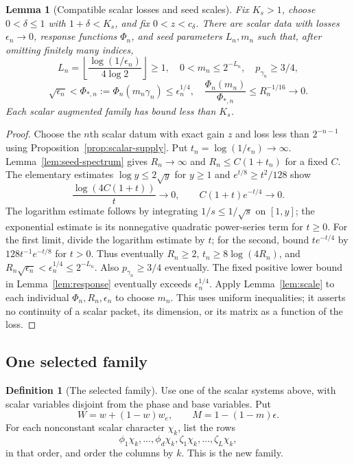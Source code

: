 \documentclass[reqno,a4paper,12pt]{amsart}
\newtheorem{lemma}[theorem]{Lemma}
\theoremstyle{definition}
\newtheorem{definition}[theorem]{Definition}
\begin{document}
\begin{lemma}[Compatible scalar losses and seed scales]\label{lem:seed-scales}
Fix $K_s>1$, choose $0<\delta\le1$ with $1+\delta<K_s$, and fix
$0<z<c_\delta$. There are scalar data with losses $\epsilon_n\to0$,
response functions $\Phi_n$, and seed parameters $L_n,m_n$ such that,
after omitting finitely many indices,
\[
 L_n=\left\lfloor\frac{\log(1/\epsilon_n)}{4\log2}\right\rfloor\ge1,
 \quad 0<m_n\le2^{-L_n},\quad p_{\gamma_n}\ge3/4,
\]
\[
 \sqrt{\epsilon_n}<\Phi_{*,n}:=\Phi_n(m_n\gamma_n)
 \le\epsilon_n^{1/4},\quad
 \frac{\Phi_n(m_n)}{\Phi_{*,n}}\le R_n^{-1/16}\to0.
\]
Each scalar augmented family has bound less than $K_s$.
\end{lemma}
\begin{proof}
Choose the $n$th scalar datum with exact gain $z$ and loss less than
$2^{-n-1}$ using Proposition~\ref{prop:scalar-supply}.
Put $t_n=\log(1/\epsilon_n)\to\infty$. Lemma~\ref{lem:seed-spectrum}
gives $R_n\to\infty$ and $R_n\le C(1+t_n)$ for a fixed $C$.
The elementary estimates
$\log y\le2\sqrt y$ for $y\ge1$ and
$e^{t/8}\ge t^2/128$ show
\[
 \frac{\log(4C(1+t))}{t}\to0,\qquad
 C(1+t)e^{-t/4}\to0.
\]
The logarithm estimate follows by integrating
$1/s\le1/\sqrt s$ on $[1,y]$; the exponential estimate is its
nonnegative quadratic power-series term for $t\ge0$.
For the first limit, divide the logarithm estimate by $t$; for the second,
bound $t e^{-t/4}$ by $128t^{-1}e^{-t/8}$ for $t>0$.
Thus eventually $R_n\ge2$,
$t_n\ge8\log(4R_n)$, and
$R_n\sqrt{\epsilon_n}<\epsilon_n^{1/4}\le2^{-L_n}$.
Also $p_{\gamma_n}\ge3/4$ eventually.
The fixed positive lower bound in Lemma~\ref{lem:response} eventually
exceeds $\epsilon_n^{1/4}$. Apply Lemma~\ref{lem:scale} to each
individual $\Phi_n,R_n,\epsilon_n$ to choose $m_n$.
This uses uniform inequalities; it asserts no continuity of a scalar
packet, its dimension, or its matrix as a function of the loss.
\end{proof}

\subsection{One selected family}
\begin{definition}[The selected family]\label{def:selected}
Use one of the scalar systems above, with scalar variables disjoint
from the phase and base variables. Put
\[
 W=w+(1-w)w_e,\qquad M=1-(1-m)\epsilon.
\]
For each nonconstant scalar character $\chi_k$, list the rows
\[
 \phi_1\chi_k,\ldots,\phi_d\chi_k,
 \zeta_1\chi_k,\ldots,\zeta_L\chi_k,
\]
in that order, and order the columns by $k$. This is the new family.
\end{definition}
\end{document}
